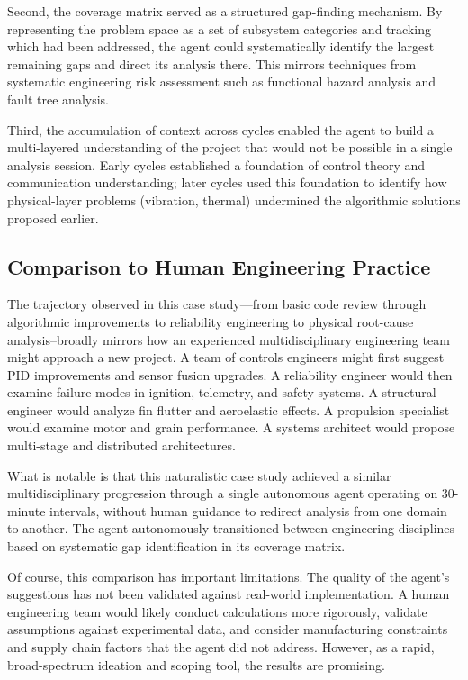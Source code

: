 \documentclass[11pt,letterpaper]{article}
\begin{document}
Second, the coverage matrix served as a structured gap-finding mechanism. By representing the problem space as a set of subsystem categories and tracking which had been addressed, the agent could systematically identify the largest remaining gaps and direct its analysis there. This mirrors techniques from systematic engineering risk assessment such as functional hazard analysis and fault tree analysis.

Third, the accumulation of context across cycles enabled the agent to build a multi-layered understanding of the project that would not be possible in a single analysis session. Early cycles established a foundation of control theory and communication understanding; later cycles used this foundation to identify how physical-layer problems (vibration, thermal) undermined the algorithmic solutions proposed earlier.

\subsection{Comparison to Human Engineering Practice}

The trajectory observed in this case study---from basic code review through algorithmic improvements to reliability engineering to physical root-cause analysis--broadly mirrors how an experienced multidisciplinary engineering team might approach a new project. A team of controls engineers might first suggest PID improvements and sensor fusion upgrades. A reliability engineer would then examine failure modes in ignition, telemetry, and safety systems. A structural engineer would analyze fin flutter and aeroelastic effects. A propulsion specialist would examine motor and grain performance. A systems architect would propose multi-stage and distributed architectures.

What is notable is that this naturalistic case study achieved a similar multidisciplinary progression through a single autonomous agent operating on 30-minute intervals, without human guidance to redirect analysis from one domain to another. The agent autonomously transitioned between engineering disciplines based on systematic gap identification in its coverage matrix.

Of course, this comparison has important limitations. The quality of the agent's suggestions has not been validated against real-world implementation. A human engineering team would likely conduct calculations more rigorously, validate assumptions against experimental data, and consider manufacturing constraints and supply chain factors that the agent did not address. However, as a rapid, broad-spectrum ideation and scoping tool, the results are promising.
\end{document}
